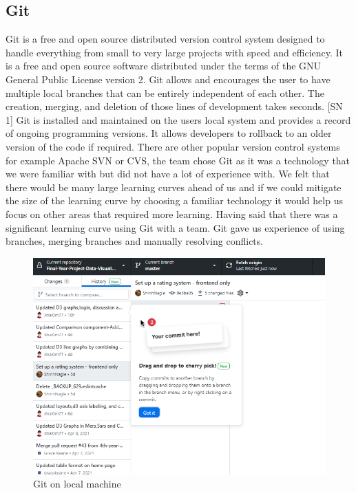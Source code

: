 \subsection{Git}
Git is a free and open source distributed version control system designed to handle everything from small to very large projects with speed and efficiency. It is a free and open source software distributed under the terms of the GNU General Public License version 2.
Git allows and encourages the user to have multiple local branches that can be entirely independent of each other. The creation, merging, and deletion of those lines of development takes seconds. [SN 1]
Git is installed and maintained on the users local system and provides a record of ongoing programming versions. It allows developers to rollback to an older version of the code if required.
There are other popular version control systems for example Apache SVN or CVS, the team chose Git as it was a technology that we were familiar with but did not have a lot of experience with. We felt that there would be many large learning curves ahead of us and if we could mitigate the size of the learning curve by choosing a familiar technology it would help us focus on other areas that required more learning. Having said that there was a significant learning curve using Git with a team. Git gave us experience of using branches, merging branches and manually resolving conflicts.
\begin{figure}
    \centering
    \includegraphics[scale=0.7]{img/git.PNG}
    \caption{Git on local machine}
    \label{fig:my_label}
\end{figure}



